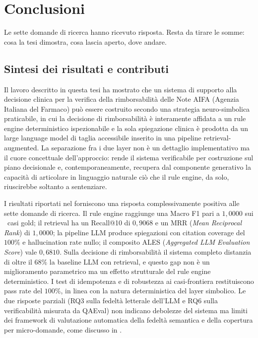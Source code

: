 \chapter{Conclusioni}
\label{ch:conclusioni}

Le sette domande di ricerca hanno ricevuto risposta. Resta da tirare le
somme: cosa la tesi dimostra, cosa lascia aperto, dove andare.

\section{Sintesi dei risultati e contributi}
\label{sec:concl-sintesi}

Il lavoro descritto in questa tesi ha mostrato che un sistema di supporto alla decisione clinica per la verifica della rimborsabilità delle Note AIFA (Agenzia Italiana del Farmaco) può essere costruito secondo una strategia neuro-simbolica praticabile, in cui la decisione di rimborsabilità è interamente affidata a un rule engine deterministico ispezionabile e la sola spiegazione clinica è prodotta da un large language model di taglia accessibile inserito in una pipeline retrieval-augmented. La separazione fra i due layer non è un dettaglio implementativo ma il cuore concettuale dell'approccio: rende il sistema verificabile per costruzione sul piano decisionale e, contemporaneamente, recupera dal componente generativo la capacità di articolare in linguaggio naturale ciò che il rule engine, da solo, riuscirebbe soltanto a sentenziare.

I risultati riportati nel  forniscono una risposta complessivamente positiva alle sette domande di ricerca. Il rule engine raggiunge una Macro F1 pari a $1{,}0000$ sui \goldn\ casi gold; il retrieval ha un Recall@10 di $0{,}9068$ e un MRR (\emph{Mean Reciprocal Rank}) di $1{,}0000$; la pipeline LLM produce spiegazioni con citation coverage del $100\%$ e hallucination rate nullo; il composito ALES (\emph{Aggregated LLM Evaluation Score}) vale $0{,}6810$. Sulla decisione di rimborsabilità il sistema completo distanzia di oltre il $68\%$ la baseline LLM con retrieval, e questo gap non è un miglioramento parametrico ma un effetto strutturale del rule engine deterministico. I test di idempotenza e di robustezza ai casi-frontiera restituiscono pass rate del $100\%$, in linea con la natura deterministica del layer simbolico. Le due risposte parziali (RQ3 sulla fedeltà letterale dell'LLM e RQ6 sulla verificabilità misurata da QAEval) non indicano debolezze del sistema ma limiti dei framework di valutazione automatica della fedeltà semantica e della copertura per micro-domande, come discusso in .

